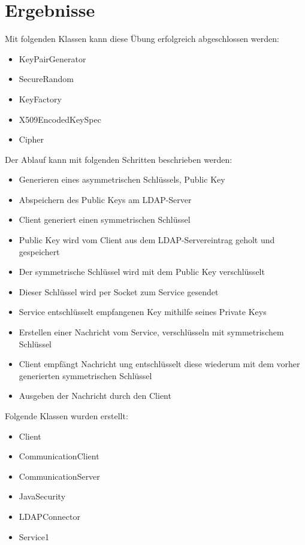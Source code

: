 \documentclass[letterpaper, 12pt]{article}
\let\tempsection\section
\renewcommand\section[1]{\vspace{-0.3cm}\tempsection{#1}\vspace{-0.3cm}}
\begin{document}
\newpage

\section{Ergebnisse}

Mit folgenden Klassen kann diese Übung erfolgreich abgeschlossen werden:
\begin{itemize}
	\item KeyPairGenerator
	\item SecureRandom
	\item KeyFactory
	\item X509EncodedKeySpec
	\item Cipher
\end{itemize}

Der Ablauf kann mit folgenden Schritten beschrieben werden:
\begin{itemize}
	\item Generieren eines asymmetrischen Schlüssels, Public Key
	\item Abspeichern des Public Keys am LDAP-Server
	\item Client generiert einen symmetrischen Schlüssel
	\item Public Key wird vom Client aus dem LDAP-Servereintrag geholt und gespeichert
	\item Der symmetrische Schlüssel wird mit dem Public Key verschlüsselt
	\item Dieser Schlüssel wird per Socket zum Service gesendet
	\item Service entschlüsselt empfangenen Key mithilfe seines Private Keys
	\item Erstellen einer Nachricht vom Service, verschlüsseln mit symmetrischem Schlüssel
	\item Client empfängt Nachricht ung entschlüsselt diese wiederum mit dem vorher generierten symmetrischen Schlüssel
	\item Ausgeben der Nachricht durch den Client
\end{itemize}

Folgende Klassen wurden erstellt:

\begin{itemize}
	\item Client
	\item CommunicationClient
	\item CommunicationServer
	\item JavaSecurity
	\item LDAPConnector
	\item Service1
\end{itemize}
\end{document}
